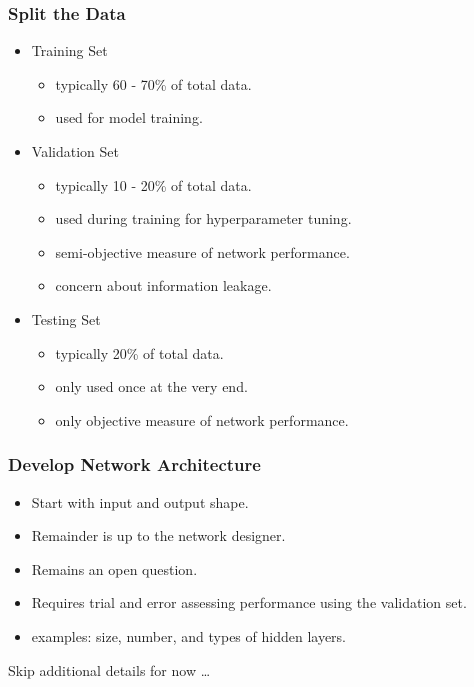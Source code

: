 \documentclass{beamer}
\begin{document}
\begin{frame}
    \frametitle{Split the Data}

    \begin{itemize}
        \item Training Set
        \begin{itemize}
            \item typically 60 - 70\% of total data.
            \item used for model training.
        \end{itemize}
        \item Validation Set
        \begin{itemize}
            \item typically 10 - 20\% of total data.
            \item used during training for hyperparameter tuning.
            \item semi-objective measure of network performance.
            \item concern about information leakage.
        \end{itemize}
        \item Testing Set
        \begin{itemize}
            \item typically 20\% of total data.
            \item only used once at the very end.
            \item only objective measure of network performance.
        \end{itemize}

    \end{itemize}
\end{frame}

\begin{frame}
    \frametitle{Develop Network Architecture}

    \begin{itemize}
        \item Start with input and output shape.
        \item Remainder is up to the network designer.
        \item Remains an open question.
        \item Requires trial and error assessing performance using the validation set.
        \item examples: size, number, and types of hidden layers.
    \end{itemize}

    Skip additional details for now …

\end{frame}
\end{document}
